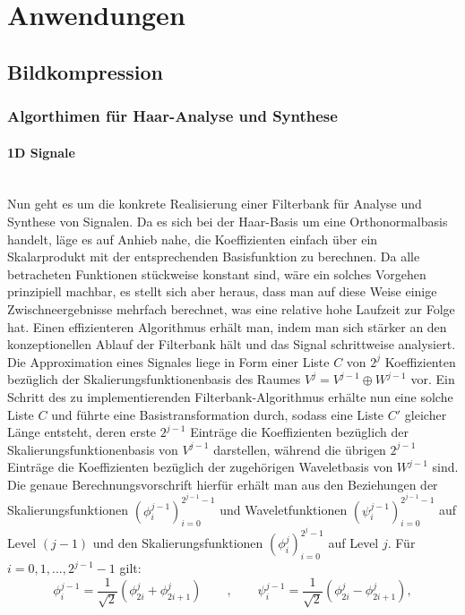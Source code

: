 \section{Anwendungen}
%
\subsection{Bildkompression}
%
\subsubsection{Algorthimen für Haar-Analyse und Synthese}
%
\paragraph{1D Signale}~\\
Nun geht es um die konkrete Realisierung einer Filterbank für Analyse und Synthese von Signalen. Da es sich bei der Haar-Basis um eine Orthonormalbasis handelt, läge es auf Anhieb nahe, die Koeffizienten einfach über ein Skalarprodukt mit der entsprechenden Basisfunktion zu berechnen. Da alle betracheten Funktionen stückweise konstant sind, wäre ein solches Vorgehen prinzipiell machbar, es stellt sich aber heraus, dass man auf diese Weise einige Zwischneergebnisse mehrfach berechnet, was eine relative hohe Laufzeit zur Folge hat. Einen effizienteren Algorithmus erhält man, indem man sich stärker an den konzeptionellen Ablauf der Filterbank hält und das Signal schrittweise analysiert.\\
%
Die Approximation eines Signales liege in Form einer Liste $C$ von $2^j$ Koeffizienten bezüglich der Skalierungsfunktionenbasis des Raumes $V^j = V^{j-1} \oplus W^{j-1}$ vor. Ein Schritt des zu implementierenden Filterbank-Algorithmus erhälte nun eine solche Liste $C$ und führte eine Basistransformation durch, sodass eine Liste $C'$ gleicher Länge entsteht, deren erste $2^{j-1}$ Einträge die Koeffizienten bezüglich der Skalierungsfunktionenbasis von $V^{j-1}$ darstellen, während die übrigen $2^{j-1}$ Einträge die Koeffizienten bezüglich der zugehörigen Waveletbasis von $W^{j-1}$ sind.\\
Die genaue Berechnungsvorschrift hierfür erhält man aus den Beziehungen der Skalierungsfunktionen $(\phi_{i}^{j-1})_{i=0}^{2^{j-1}-1}$ und Waveletfunktionen $(\psi_{i}^{j-1})_{i=0}^{2^{j-1}-1}$ auf Level $(j-1)$ und den Skalierungsfunktionen $(\phi_{i}^{j})_{i=0}^{2^{j}-1}$ auf Level $j$. Für $i = 0, 1, ..., 2^{j-1}-1$ gilt:
%
\[
\phi_{i}^{j-1} = \frac{1}{\sqrt{2}}( \phi_{2i}^{j} + \phi_{2i+1}^{j} )
\qquad , \qquad
\psi_{i}^{j-1} = \frac{1}{\sqrt{2}}( \phi_{2i}^{j} - \phi_{2i+1}^{j} )
,
\]
